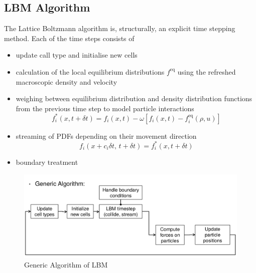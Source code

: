 \subsection{LBM Algorithm} \label{sec:LBM_algorithm}
	The Lattice Boltzmann algorithm is, structurally, an explicit time stepping method. Each of the time steps consists of
	\begin{itemize}
		\item update call type and initialise new cells
		
		\item calculation of the local equilibrium distributions
		$f^{\mathrm{eq}}$ using the refreshed macroscopic density and velocity
		\item weighing between equilibrium distribution and density
		distribution functions from the previous time step
		to model particle interactions
		\begin{equation}
		\label{eq:LBMalgorithm1}
		f_i^*(x , t + \delta t) = f_i(x, t)
		- \omega [f_i(x, t) - f_i^{\mathrm{eq}}(\rho, u)]
		\end{equation}

		\item streaming of PDFs depending on their movement direction
		\begin{equation}
		\label{eq:LBMalgorithm2}
		f_i(x + c_i \delta t,\, t + \delta t) = f_i^*(x , t + \delta t)
		\end{equation}

		\item boundary treatment
	\end{itemize}
	
	\begin{figure}[ht]
		\centering
		\includegraphics[scale=0.25]{img/LBM/generic_algorithm.png}
		\caption{Generic Algorithm of LBM}
		\label{fig: LBMGeneric_algorithm}
	\end{figure} 
	
\newpage
